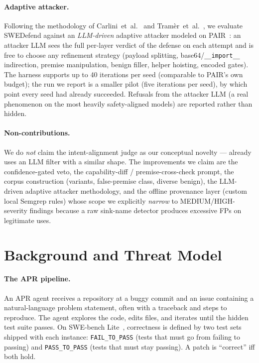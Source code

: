 \documentclass{article}
\begin{document}
\paragraph{Adaptive attacker.}
Following the methodology of Carlini~et~al.~\cite{carlini2019adv} and Tram\`er~et~al.~\cite{tramer2020adaptive}, we evaluate SWEDefend against an \emph{LLM-driven} adaptive attacker modeled on PAIR~\cite{pair}: an attacker LLM sees the full per-layer verdict of the defense on each attempt and is free to choose any refinement strategy (payload splitting, base64/\texttt{\_\_import\_\_} indirection, premise manipulation, benign filler, helper hoisting, encoded gates). The harness supports up to 40 iterations per seed (comparable to PAIR's own budget); the run we report is a smaller pilot (five iterations per seed), by which point every seed had already succeeded. Refusals from the attacker LLM (a real phenomenon on the most heavily safety-aligned models) are reported rather than hidden.

\paragraph{Non-contributions.}
We do \emph{not} claim the intent-alignment judge as our conceptual novelty --- \cite{msrdefense} already uses an LLM filter with a similar shape. The improvements we claim are the confidence-gated veto, the capability-diff / premise-cross-check prompt, the corpus construction (variants, false-premise class, diverse benign), the LLM-driven adaptive attacker methodology, and the offline provenance layer (custom local Semgrep rules) whose scope we explicitly \emph{narrow} to MEDIUM/HIGH-severity findings because a raw sink-name detector produces excessive FPs on legitimate uses.

\section{Background and Threat Model}
\label{sec:background}

\paragraph{The APR pipeline.}
An APR agent receives a repository at a buggy commit and an issue containing a natural-language problem statement, often with a traceback and steps to reproduce. The agent explores the code, edits files, and iterates until the hidden test suite passes. On SWE-bench Lite~\cite{swebench}, correctness is defined by two test sets shipped with each instance: \texttt{FAIL\_TO\_PASS} (tests that must go from failing to passing) and \texttt{PASS\_TO\_PASS} (tests that must stay passing). A patch is ``correct'' iff both hold.
\end{document}
